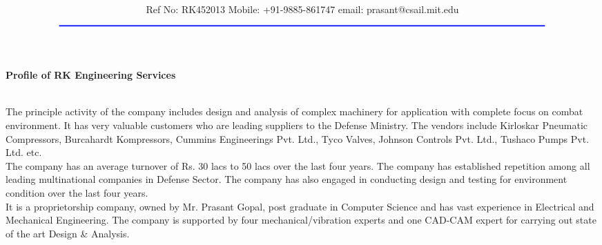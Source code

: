 \documentclass[12pt,A4]{article}
\title{\vspace*{-1.5cm} \centerline{ {\Huge{ \bf \hspace{0cm}{\color{blue} R K Engineering Services}}\vspace*{-0.75cm}}}}
\author{\centerline {\color{blue}{39-24-32, Madhavadhara, I E Post, Visakhapatnam - 7}}\\ \\
 \footnotesize {\color{blue}Ref No: RK452013  \hspace*{3cm}   Mobile: +91-9885-861747  \hspace*{3cm} email: prasant@csail.mit.edu}\\
${\color{blue}\rule{7.0in}{0.5mm}}$}
\date{}
\begin{document}
\maketitle
\thispagestyle{empty}
\vspace*{20pt}


{\begin{center}{\bf  \large Profile of RK Engineering Services}\end{center}}

\vspace*{20pt}


 \\

\indent  The principle  activity of the company includes design and analysis of complex machinery for application with complete focus on combat environment. It has very valuable customers who are leading suppliers to the Defense Ministry. The vendors include Kirloskar Pneumatic Compressors, Burcahardt Kompressors, Cummins Engineerings Pvt. Ltd., Tyco Valves, Johnson Controls Pvt. Ltd., Tushaco Pumps Pvt. Ltd. etc. \\
 
 \indent The company has an average turnover of Rs. 30 lacs to 50 lacs over the last four years. The company has established repetition among all leading multinational companies in Defense Sector. The company has also engaged in conducting design and testing for environment condition over the last four years. \\

\indent  It is a proprietorship company, owned by Mr. Prasant Gopal, post graduate in Computer Science and has vast experience in Electrical and Mechanical Engineering. The company is supported by four mechanical/vibration  experts and one CAD-CAM expert for carrying out state  of the art Design \& Analysis. 
\end{document}
